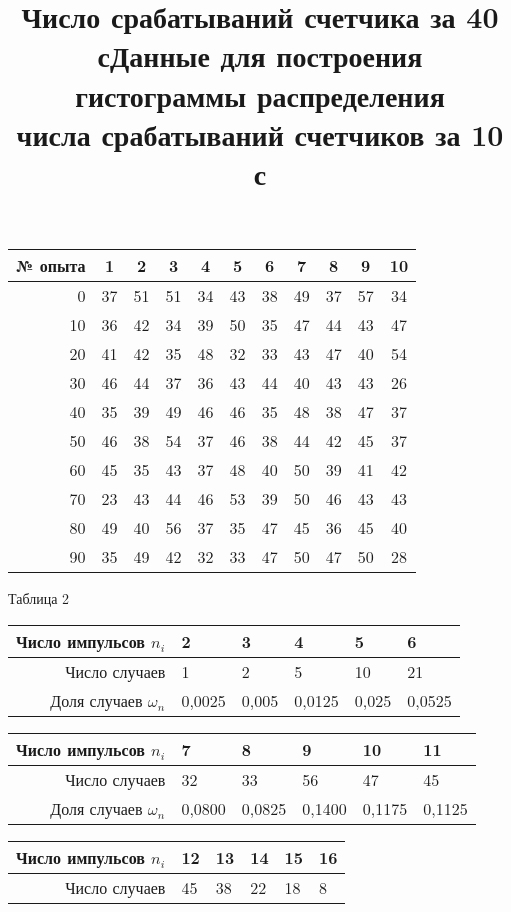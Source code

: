 \documentclass[a4paper, 10pt]{article}
\begin{document}
\begin{enumerate}
\begin{enumerate}
\begin {center}
\title {\textbf{Число срабатываний счетчика за 40 с}}
	\begin{tabular}{|r|c|c|c|c|c|c|c|c|c|c|}
\hline
№ опыта&1&2&3&4&5&6&7&8&9&10\\
\hline
0&37&51&51&34&43&38&49&37&57&34\\
\hline
10&36&42&34&39&50&35&47&44&43&47\\
\hline
20&41&42&35&48&32&33&43&47&40&54\\
\hline
30&46&44&37&36&43&44&40&43&43&26\\
\hline
40&35&39&49&46&46&35&48&38&47&37\\
\hline
50&46&38&54&37&46&38&44&42&45&37\\
\hline
60&45&35&43&37&48&40&50&39&41&42\\
\hline
70&23&43&44&46&53&39&50&46&43&43\\
\hline
80&49&40&56&37&35&47&45&36&45&40\\
\hline
90&35&49&42&32&33&47&50&47&50&28\\
\hline
\end{tabular}
\end{center} \begin{table}  
\begin {center} \hspace {90 mm} Таблица 2\\ \title{\textbf{Данные для построения гистограммы распределения \\ числа срабатываний счетчиков за 10 с \\}}
\begin{tabular}{|r|p{1cm}|p{1cm}|p{1cm}|p{1cm}|p{1cm}|}
\hline
Число импульсов $n_i$&2&3&4&5&6\\
\hline
Число случаев&1&2&5&10&21\\
\hline
Доля случаев $\omega_n$&0,0025&0,005&0,0125&0,025&0,0525\\
\hline
\end{tabular}
\begin{tabular}{|r|p{1cm}|p{1cm}|p{1cm}|p{1cm}|p{1cm}|}
\hline
Число импульсов $n_i$&7&8&9&10&11\\
\hline
Число случаев&32&33&56&47&45\\
\hline
Доля случаев $\omega_n$&0,0800&0,0825&0,1400&0,1175&0,1125\\
\hline
\end{tabular}
\begin{tabular}{|r|p{1cm}|p{1cm}|p{1cm}|p{1cm}|p{1cm}|}
\hline
Число импульсов $n_i$&12&13&14&15&16\\
\hline
Число случаев&45&38&22&18&8\\

\end{tabular}
\end{center}
\end{table}
\end{enumerate}
\end{enumerate}
\end{document}
